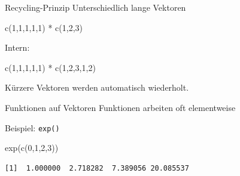 \documentclass[
  10pt,
  ignorenonframetext,
  aspectratio=169,
]{beamer}
\newenvironment{Shaded}{}{}
\newcommand{\DecValTok}[1]{\textcolor[rgb]{0.25,0.63,0.44}{#1}}
\newcommand{\FunctionTok}[1]{\textcolor[rgb]{0.02,0.16,0.49}{#1}}
\newcommand{\NormalTok}[1]{#1}
\newcommand{\SpecialCharTok}[1]{\textcolor[rgb]{0.25,0.44,0.63}{#1}}
\begin{document}
\begin{frame}[fragile]{Recycling-Prinzip}
\label{recycling-prinzip}
Unterschiedlich lange Vektoren

\begin{Shaded}
\begin{Highlighting}[]
\FunctionTok{c}\NormalTok{(}\DecValTok{1}\NormalTok{,}\DecValTok{1}\NormalTok{,}\DecValTok{1}\NormalTok{,}\DecValTok{1}\NormalTok{,}\DecValTok{1}\NormalTok{) }\SpecialCharTok{*} \FunctionTok{c}\NormalTok{(}\DecValTok{1}\NormalTok{,}\DecValTok{2}\NormalTok{,}\DecValTok{3}\NormalTok{)}
\end{Highlighting}
\end{Shaded}

Intern:

\begin{Shaded}
\begin{Highlighting}[]
\FunctionTok{c}\NormalTok{(}\DecValTok{1}\NormalTok{,}\DecValTok{1}\NormalTok{,}\DecValTok{1}\NormalTok{,}\DecValTok{1}\NormalTok{,}\DecValTok{1}\NormalTok{) }\SpecialCharTok{*} \FunctionTok{c}\NormalTok{(}\DecValTok{1}\NormalTok{,}\DecValTok{2}\NormalTok{,}\DecValTok{3}\NormalTok{,}\DecValTok{1}\NormalTok{,}\DecValTok{2}\NormalTok{)}
\end{Highlighting}
\end{Shaded}

Kürzere Vektoren werden automatisch wiederholt.
\end{frame}

\begin{frame}[fragile]{Funktionen auf Vektoren}
\label{funktionen-auf-vektoren}
Funktionen arbeiten oft elementweise

Beispiel: \texttt{exp()}

\begin{Shaded}
\begin{Highlighting}[]
\FunctionTok{exp}\NormalTok{(}\FunctionTok{c}\NormalTok{(}\DecValTok{0}\NormalTok{,}\DecValTok{1}\NormalTok{,}\DecValTok{2}\NormalTok{,}\DecValTok{3}\NormalTok{))}
\end{Highlighting}
\end{Shaded}

\begin{verbatim}
[1]  1.000000  2.718282  7.389056 20.085537
\end{verbatim}
\end{frame}
\end{document}
